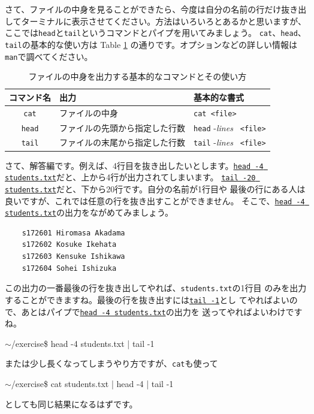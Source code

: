 \documentclass[a4j]{ltjsreport}
\begin{document}
    さて、ファイルの中身を見ることができたら、今度は自分の名前の行だけ抜き出
    してターミナルに表示させてください。方法はいろいろとあるかと思いますが、
    ここでは\verb+head+と\verb+tail+というコマンドとパイプを用いてみましょう。
    \verb+cat+、\verb+head+、\verb+tail+の基本的な使い方は Table \ref{tab:cat}
    の通りです。オプションなどの詳しい情報は\verb+man+で調べてください。
    \begin{table}[htbp]
        \centering
        \caption{ファイルの中身を出力する基本的なコマンドとその使い方}
        \label{tab:cat}
        \begin{tabular}{cll}
            \hline
            \hline
            コマンド名 & 出力 & 基本的な書式\footnotemark \\
            \hline
            \texttt{cat}  & ファイルの中身              & \verb+cat <file>+ \\
            \texttt{head} & ファイルの先頭から指定した行数 & \verb+head+ -\textit{lines} \verb+ <file>+ \\
            \texttt{tail} & ファイルの末尾から指定した行数 & \verb+tail+ -\textit{lines} \verb+ <file>+ \\
            \hline
            \hline
        \end{tabular}
    \end{table}

    さて、解答編です。例えば、4行目を抜き出したいとします。\underline{\texttt{head
    -4 students.txt}}だと、上から4行が出力されてしまいます。
    \underline{\texttt{tail -20 students.txt}}だと、下から20行です。自分の名前が1行目や
    最後の行にある人は良いですが、これでは任意の行を抜き出すことができません。
    そこで、\underline{\texttt{head -4 students.txt}}の出力をながめてみましょう。
    \begin{verbatim}
    s172601 Hiromasa Akadama
    s172602 Kosuke Ikehata
    s172603 Kensuke Ishikawa
    s172604 Sohei Ishizuka
    \end{verbatim}

    この出力の一番最後の行を抜き出してやれば、\verb+students.txt+の1行目
    のみを出力することができますね。最後の行を抜き出すには\underline{\texttt{tail -1}}とし
    てやればよいので、あとはパイプで\underline{\texttt{head -4 students.txt}}の出力を
    送ってやればよいわけですね。
    \begin{screen}
        $\sim$/exercise\$ head  -4  students.txt  |  tail  -1 
    \end{screen}
    または少し長くなってしまうやり方ですが、\verb+cat+も使って
    \begin{screen}
        $\sim$/exercise\$ cat students.txt | head -4 | tail -1
    \end{screen}
    としても同じ結果になるはずです。
\end{document}
